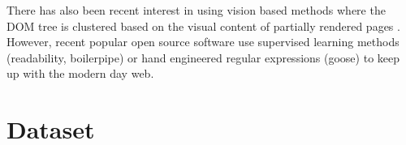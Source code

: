 \documentclass{article} %
\begin{document}
There has also been recent interest in using vision based methods \cite{Bar-Yossef:2002:TDV:511446.511522} \cite{Chen:2006:TDL:1141277.1141534} where the DOM tree is clustered based on the visual content of partially rendered pages \cite{Dan:hybrid2013}. However, recent popular open source software use supervised learning methods (readability, boilerpipe) or hand engineered regular expressions (goose) to keep up with the modern day web. 



\section{Dataset}
\label{sec:Dataset}
\end{document}
